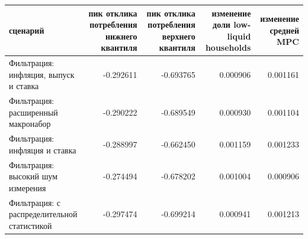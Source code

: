 \begin{tabular}{lrrrr}
\toprule
сценарий & пик отклика потребления нижнего квантиля & пик отклика потребления верхнего квантиля & изменение доли low-liquid households & изменение средней MPC \\
\midrule
Фильтрация: инфляция, выпуск и ставка & -0.292611 & -0.693765 & 0.000906 & 0.001161 \\
Фильтрация: расширенный макронабор & -0.290222 & -0.689549 & 0.000930 & 0.001104 \\
Фильтрация: инфляция и ставка & -0.288997 & -0.662450 & 0.001159 & 0.001233 \\
Фильтрация: высокий шум измерения & -0.274494 & -0.678202 & 0.001004 & 0.000906 \\
Фильтрация: с распределительной статистикой & -0.297474 & -0.699214 & 0.000941 & 0.001213 \\
\bottomrule
\end{tabular}
